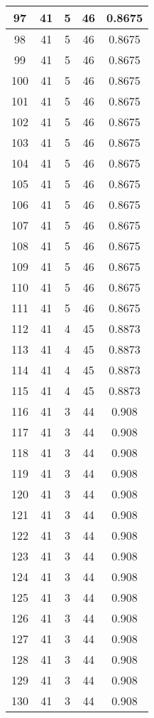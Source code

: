 \documentclass[letterpaper, 12pt]{article}
\begin{document}
\begin{longtable}{|c|c|c|c|c|}
\hline
97 & 41 & 5 & 46 & 0.8675 \\
\hline
98 & 41 & 5 & 46 & 0.8675 \\
\hline
99 & 41 & 5 & 46 & 0.8675 \\
\hline
100 & 41 & 5 & 46 & 0.8675 \\
\hline
101 & 41 & 5 & 46 & 0.8675 \\
\hline
102 & 41 & 5 & 46 & 0.8675 \\
\hline
103 & 41 & 5 & 46 & 0.8675 \\
\hline
104 & 41 & 5 & 46 & 0.8675 \\
\hline
105 & 41 & 5 & 46 & 0.8675 \\
\hline
106 & 41 & 5 & 46 & 0.8675 \\
\hline
107 & 41 & 5 & 46 & 0.8675 \\
\hline
108 & 41 & 5 & 46 & 0.8675 \\
\hline
109 & 41 & 5 & 46 & 0.8675 \\
\hline
110 & 41 & 5 & 46 & 0.8675 \\
\hline
111 & 41 & 5 & 46 & 0.8675 \\
\hline
112 & 41 & 4 & 45 & 0.8873 \\
\hline
113 & 41 & 4 & 45 & 0.8873 \\
\hline
114 & 41 & 4 & 45 & 0.8873 \\
\hline
115 & 41 & 4 & 45 & 0.8873 \\
\hline
116 & 41 & 3 & 44 & 0.908 \\
\hline
117 & 41 & 3 & 44 & 0.908 \\
\hline
118 & 41 & 3 & 44 & 0.908 \\
\hline
119 & 41 & 3 & 44 & 0.908 \\
\hline
120 & 41 & 3 & 44 & 0.908 \\
\hline
121 & 41 & 3 & 44 & 0.908 \\
\hline
122 & 41 & 3 & 44 & 0.908 \\
\hline
123 & 41 & 3 & 44 & 0.908 \\
\hline
124 & 41 & 3 & 44 & 0.908 \\
\hline
125 & 41 & 3 & 44 & 0.908 \\
\hline
126 & 41 & 3 & 44 & 0.908 \\
\hline
127 & 41 & 3 & 44 & 0.908 \\
\hline
128 & 41 & 3 & 44 & 0.908 \\
\hline
129 & 41 & 3 & 44 & 0.908 \\
\hline
130 & 41 & 3 & 44 & 0.908 \\

\end{longtable}
\end{document}
